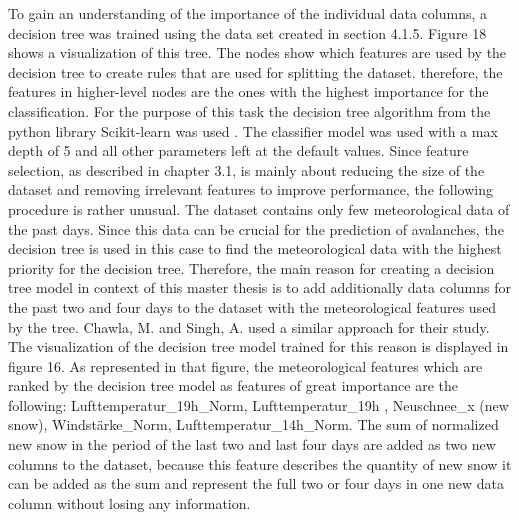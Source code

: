 \documentclass[../masterarbeit.tex]{subfiles}
\begin{document}
To gain an understanding of the importance of the individual data columns, a decision tree was trained using the data set created in section 4.1.5. Figure 18 shows a visualization of this tree. The nodes show which features are used by the decision tree to create rules that are used for splitting the dataset. therefore, the features in higher-level nodes are the ones with the highest importance for the classification.
For the purpose of this task the decision tree algorithm from the python library Scikit-learn was used \textcite[]{Scikit-learn-decision-tree-classifier:2022}. The classifier model was used with a max depth of 5 and all other parameters left at the default values.
Since feature selection, as described in chapter 3.1, is mainly about reducing the size of the dataset and removing irrelevant features to improve performance, the following procedure is rather unusual. 
The dataset contains only few meteorological data of the past days. Since this data can be crucial for the prediction of avalanches, the decision tree is used in this case to find the meteorological data with the highest priority for the decision tree. 
Therefore, the main reason for creating a decision tree model in context of this master thesis is to add additionally data columns for the past two and four days to the dataset with the meteorological features used by the tree. Chawla, M. and Singh, A. \textcite[]{nhess-2021-106} used a similar approach for their study. The visualization of the decision tree model trained for this reason is displayed in figure 16. As represented in that figure, the meteorological features which are ranked by the decision tree model as features of great importance are the following: Lufttemperatur\_19h\_Norm, Lufttemperatur\_19h , Neuschnee\_x (new snow), Windstärke\_Norm, Lufttemperatur\_14h\_Norm.
The sum of normalized new snow in the period of the last two and last four days are added as two new columns to the dataset, because this feature describes the quantity of new snow it can be added as the sum and represent the full two or four days in one new data column without losing any information.
\end{document}
